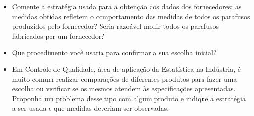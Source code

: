 \begin{reflection}

\begin{itemize}
\item Comente a estratégia usada para a obtenção dos dados dos fornecedores: as medidas obtidas refletem o comportamento das medidas de todos os parafusos produzidos pelo fornecedor? Seria razoável medir todos os parafusos fabricados por um fornecedor?

\item Que procedimento você usaria para confirmar a sua escolha inicial?

\item Em Controle de Qualidade, área de aplicação da Estatística na Indústria, é muito comum realizar comparações de diferentes produtos para fazer uma escolha ou verificar se os mesmos atendem às especificações apresentadas. Proponha um problema desse tipo com algum produto e indique a estratégia a ser usada e que medidas deveriam ser observadas.

\end{itemize}
\end{reflection}

